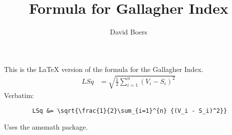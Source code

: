 \documentclass{article}
\title{Formula for Gallagher Index}
\author{David Boers}
\begin{document}
    \maketitle
    This is the \LaTeX{} version of the formula for the Gallagher Index.
    \begin{align}
        LSq &= \sqrt{\frac{1}{2}\sum_{i=1}^{n} {(V_i - S_i)^2}}
    \end{align}
    Verbatim:
    \begin{verbatim}
        LSq &= \sqrt{\frac{1}{2}\sum_{i=1}^{n} {(V_i - S_i)^2}}
    \end{verbatim}
    Uses the amsmath package.
\end{document}
